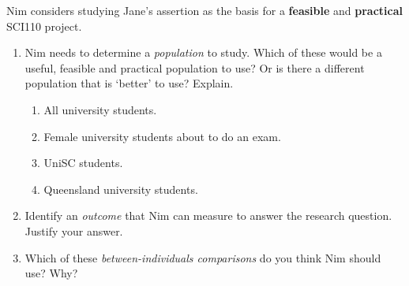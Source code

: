 \documentclass[
  11pt,
  a4paper,
  krantz2]{krantz}
\providecommand{\tightlist}{%
  \setlength{\itemsep}{0pt}\setlength{\parskip}{0pt}}
\newlength{\greyboxheight}
\newcommand{\setgreyboxheight}[1]{%
  \setlength{\greyboxheight}{2.3\baselineskip * #1}%
}
\newenvironment{greybox}[1]{%
  \nopagebreak
  \setgreyboxheight{#1}%
  \begin{tcolorbox}[
    colframe=gray!30!black,
    boxrule=2pt,
    width=\linewidth,
    height=\greyboxheight,
    valign=center,
    colback=white,
    left=4pt,
    right=4pt, 
    top=4pt, 
    bottom=4pt,
    before skip=4pt,
    after skip=4pt
  ]
\vspace*{\greyboxheight} %
}{%
  \end{tcolorbox}
  \goodbreak
}
\newcommand{\answerbox}[1]{\noindent\begin{greybox}{#1}\end{greybox}}
\begin{document}
Nim considers studying Jane's assertion as the basis for a \textbf{feasible} and \textbf{practical} SCI110 project.

\begin{enumerate}
\def\labelenumi{\arabic{enumi}.}
\tightlist
\item
  Nim needs to determine a \emph{population} to study.
  Which of these would be a useful, feasible and practical population to use?
  Or is there a different population that is `better' to use?
  Explain.

  \begin{enumerate}
  \def\labelenumii{\alph{enumii}.}
  \tightlist
  \item
    All university students.
  \item
    Female university students about to do an exam.
  \item
    UniSC students.
  \item
    Queensland university students.
  \end{enumerate}
\item
  Identify an \emph{outcome} that Nim can measure to answer the research question.
  Justify your answer.
  \answerbox{3}
\item
  Which of these \emph{between-individuals comparisons} do you think Nim should use?
  Why?


\end{enumerate}
\end{document}

